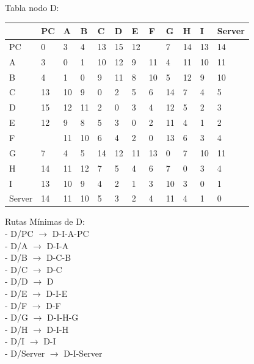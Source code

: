 \documentclass[a4paper]{article}
\begin{document}
\clearpage



\begin{table}[ht]
Tabla nodo D:\\
\begin{tabular}{|l|l|l|l|l|l|l|l|l|l|l|l|}
\hline
       & PC & A  & B & C & D & E & F & G & H & I  & Server \\ \hline
PC     & 0  & 3  & 4 & 13& 15& 12&   & 7 & 14& 13 & 14     \\ \hline
A      & 3  & 0  & 1 & 10& 12& 9 & 11& 4 & 11& 10 & 11     \\ \hline
B      & 4  & 1  & 0 & 9 & 11& 8 & 10& 5 & 12& 9  & 10     \\ \hline
C      & 13 & 10 & 9 & 0 & 2 & 5 & 6 & 14& 7 & 4  & 5      \\ \hline
D      & 15 & 12 & 11& 2 & 0 & 3 & 4 & 12& 5 & 2  & 3      \\ \hline
E      & 12 & 9  & 8 & 5 & 3 & 0 & 2 & 11& 4 & 1  & 2      \\ \hline
F      &    & 11 & 10& 6 & 4 & 2 & 0 & 13& 6 & 3  & 4      \\ \hline
G      & 7  & 4  & 5 & 14& 12& 11& 13& 0 & 7 & 10 & 11     \\ \hline
H      & 14 & 11 & 12& 7 & 5 & 4 & 6 & 7 & 0 & 3  & 4      \\ \hline
I      & 13 & 10 & 9 & 4 & 2 & 1 & 3 & 10& 3 & 0  & 1      \\ \hline
Server & 14 & 11 & 10& 5 & 3 & 2 & 4 & 11& 4 & 1  & 0      \\ \hline
\end{tabular}

Rutas Mínimas de D:\\
-	D/PC  $\rightarrow$  D-I-A-PC\\
-	D/A  $\rightarrow$  D-I-A\\
-	D/B  $\rightarrow$  D-C-B\\
-	D/C  $\rightarrow$ D-C\\
-	D/D  $\rightarrow$  D\\
-	D/E  $\rightarrow$  D-I-E\\
-	D/F  $\rightarrow$ D-F\\
-	D/G  $\rightarrow$ D-I-H-G\\
-	D/H  $\rightarrow$  D-I-H\\
-	D/I  $\rightarrow$  D-I\\
-	D/Server  $\rightarrow$  D-I-Server\\
\end{table}
\clearpage
\end{document}
